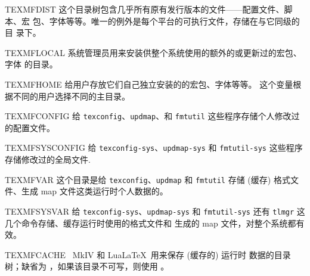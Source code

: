 \documentclass{article}
\begin{document}
\begin{ttdescription}
\item [TEXMFDIST] 这个目录树包含几乎所有原有发行版本的文件——配置文件、脚本、宏
包、字体等等。唯一的例外是每个平台的可执行文件，存储在与它同级的  目
录下。
\item [TEXMFLOCAL] 系统管理员用来安装供整个系统使用的额外的或更新过的宏包、字体
的目录。
\item [TEXMFHOME] 给用户存放它们自己独立安装的的宏包、字体等等。
这个变量根据不同的用户选择不同的主目录。
\item [TEXMFCONFIG] 给 \verb+texconfig+、\verb+updmap+、和 \verb+fmtutil+
这些程序存储个人修改过的配置文件。
\item [TEXMFSYSCONFIG] 给 \verb+texconfig-sys+、\verb+updmap-sys+ 和
\verb+fmtutil-sys+ 这些程序存储修改过的全局文件.
\item [TEXMFVAR] 这个目录是给 \verb+texconfig+、\verb+updmap+ 和
  \verb+fmtutil+ 存储 (缓存) 格式文件、生成 map 文件这类运行时个人数据的。
\item [TEXMFSYSVAR] 给 \verb+texconfig-sys+、\verb+updmap-sys+ 和
\verb+fmtutil-sys+ 还有 \verb+tlmgr+ 这几个命令存储、缓存运行时使用的格式文件和
生成的 map 文件，对整个系统都有效。
\item [TEXMFCACHE] \ConTeXt\ MkIV 和 Lua\LaTeX\ 用来保存 (缓存的) 运行时
数据的目录树；缺省为 ，如果该目录不可写，则使用
。
\end{ttdescription}
\end{document}
